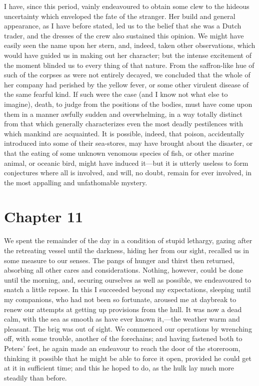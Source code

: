 I have, since this period, vainly endeavoured to obtain some clew to the
hideous uncertainty which enveloped the fate of the stranger. Her build and
general appearance, as I have before stated, led us to the belief that she was a
Dutch trader, and the dresses of the crew also sustained this opinion. We might
have easily seen the name upon her stern, and, indeed, taken other observations,
which would have guided us in making out her character; but the intense
excitement of the moment blinded us to every thing of that nature. From the
saffron-like hue of such of the corpses as were not entirely decayed, we
concluded that the whole of her company had perished by the yellow fever, or
some other virulent disease of the same fearful kind. If such were the case (and
I know not what else to imagine), death, to judge from the positions of the
bodies, must have come upon them in a manner awfully sudden and overwhelming, in
a way totally distinct from that which generally characterizes even the most
deadly pestilences with which mankind are acquainted. It is possible, indeed,
that poison, accidentally introduced into some of their sea-stores, may have
brought about the disaster, or that the eating of some unknown venomous species
of fish, or other marine animal, or oceanic bird, might have induced it---but it
is utterly useless to form conjectures where all is involved, and will, no
doubt, remain for ever involved, in the most appalling and unfathomable
mystery. 

\section{Chapter 11}
We spent the remainder of the day in a condition of stupid lethargy, gazing
after the retreating vessel until the darkness, hiding her from our sight,
recalled us in some measure to our senses. The pangs of hunger and thirst then
returned, absorbing all other cares and considerations. Nothing, however, could
be done until the morning, and, securing ourselves as well as possible, we
endeavoured to snatch a little repose. In this I succeeded beyond my
expectations, sleeping until my companions, who had not been so fortunate,
aroused me at daybreak to renew our attempts at getting up provisions from the
hull. It was now a dead calm, with the sea as smooth as have ever known
it,---the weather warm and pleasant. The brig was out of sight. We commenced our
operations by wrenching off, with some trouble, another of the forechains; and
having fastened both to Peters' feet, he again made an endeavour to reach the
door of the storeroom, thinking it possible that he might be able to force it
open, provided he could get at it in sufficient time; and this he hoped to do,
as the hulk lay much more steadily than before. 

